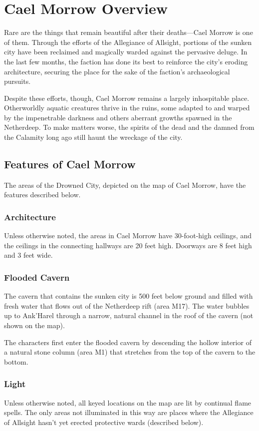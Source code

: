 \documentclass[10pt,a4paper,twoside,bg=print,twocolumn,openany,nodeprecatedcode]{dndbook}
\begin{document}
\section{Cael Morrow Overview}
Rare are the things that remain beautiful after their deaths—Cael Morrow is one of them. Through the efforts of the Allegiance of Allsight, portions of the sunken city have been reclaimed and magically warded against the pervasive deluge. In the last few months, the faction has done its best to reinforce the city's eroding architecture, securing the place for the sake of the faction's archaeological pursuits.

Despite these efforts, though, Cael Morrow remains a largely inhospitable place. Otherworldly aquatic creatures thrive in the ruins, some adapted to and warped by the impenetrable darkness and others aberrant growths spawned in the Netherdeep. To make matters worse, the spirits of the dead and the damned from the Calamity long ago still haunt the wreckage of the city.

\subsection{Features of Cael Morrow}
The areas of the Drowned City, depicted on the map of Cael Morrow, have the features described below.

\subsubsection{Architecture}
Unless otherwise noted, the areas in Cael Morrow have 30-foot-high ceilings, and the ceilings in the connecting hallways are 20 feet high. Doorways are 8 feet high and 3 feet wide.

\subsubsection{Flooded Cavern}
The cavern that contains the sunken city is 500 feet below ground and filled with fresh water that flows out of the Netherdeep rift (area M17). The water bubbles up to Ank'Harel through a narrow, natural channel in the roof of the cavern (not shown on the map).

The characters first enter the flooded cavern by descending the hollow interior of a natural stone column (area M1) that stretches from the top of the cavern to the bottom.

\subsubsection{Light}
Unless otherwise noted, all keyed locations on the map are lit by continual flame spells. The only areas not illuminated in this way are places where the Allegiance of Allsight hasn't yet erected protective wards (described below).
\end{document}
